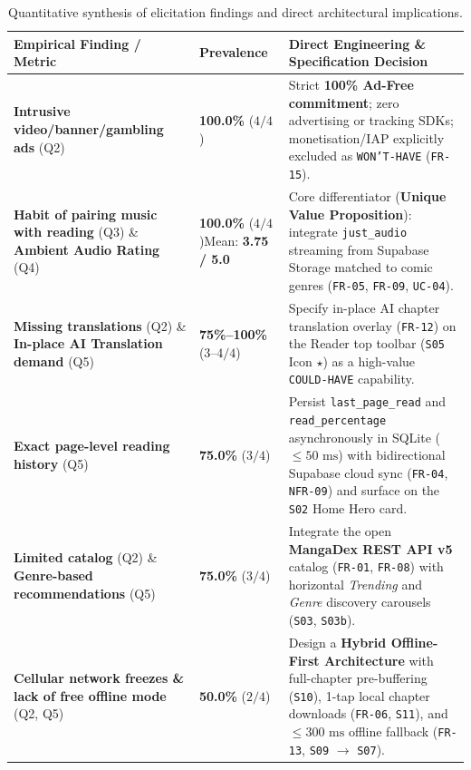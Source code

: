 \begin{table}[H]
\centering
\caption{Quantitative synthesis of elicitation findings and direct architectural implications.}
\label{tab:survey_stats}
\footnotesize
\renewcommand{\arraystretch}{1.25}
\begin{tabularx}{\textwidth}{L{4.2cm} C{2.0cm} Y}
\toprule
{}
\textbf{Empirical Finding / Metric} & \textbf{Prevalence} & \textbf{Direct Engineering \& Specification Decision} \\
\midrule
\textbf{Intrusive video/banner/gambling ads} (Q2) & \textbf{100.0\%} ($4/4$) & Strict \textbf{100\% Ad-Free commitment}; zero advertising or tracking SDKs; monetisation/IAP explicitly excluded as \texttt{WON'T-HAVE} (\texttt{FR-15}). \\
\textbf{Habit of pairing music with reading} (Q3) \& \textbf{Ambient Audio Rating} (Q4) & \textbf{100.0\%} ($4/4$)\newline Mean: \textbf{3.75 / 5.0} & Core differentiator (\textbf{Unique Value Proposition}): integrate \texttt{just\_audio} streaming from Supabase Storage matched to comic genres (\texttt{FR-05}, \texttt{FR-09}, \texttt{UC-04}). \\
\textbf{Missing translations} (Q2) \& \textbf{In-place AI Translation demand} (Q5) & \textbf{75\%--100\%} ($3\text{--}4/4$) & Specify in-place AI chapter translation overlay (\texttt{FR-12}) on the Reader top toolbar (\texttt{S05} Icon $\star$) as a high-value \texttt{COULD-HAVE} capability. \\
\textbf{Exact page-level reading history} (Q5) & \textbf{75.0\%} ($3/4$) & Persist \texttt{last\_page\_read} and \texttt{read\_percentage} asynchronously in SQLite ($\le 50\text{ ms}$) with bidirectional Supabase cloud sync (\texttt{FR-04}, \texttt{NFR-09}) and surface on the \texttt{S02} Home Hero card. \\
\textbf{Limited catalog} (Q2) \& \textbf{Genre-based recommendations} (Q5) & \textbf{75.0\%} ($3/4$) & Integrate the open \textbf{MangaDex REST API v5} catalog (\texttt{FR-01}, \texttt{FR-08}) with horizontal \textit{Trending} and \textit{Genre} discovery carousels (\texttt{S03}, \texttt{S03b}). \\
\textbf{Cellular network freezes \& lack of free offline mode} (Q2, Q5) & \textbf{50.0\%} ($2/4$) & Design a \textbf{Hybrid Offline-First Architecture} with full-chapter pre-buffering (\texttt{S10}), 1-tap local chapter downloads (\texttt{FR-06}, \texttt{S11}), and $\le 300\text{ ms}$ offline fallback (\texttt{FR-13}, \texttt{S09} $\to$ \texttt{S07}). \\

\end{tabularx}
\end{table}

